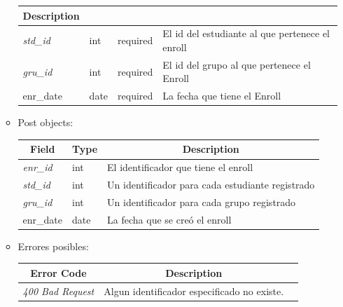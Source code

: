 \documentclass{article}
\begin{document}
\begin{enumerate}
\begin{itemize}
\begin{table}[H]
\begin{tabular}{|l|l|l|l|}
        \multicolumn{1}{c|}{\textbf{Description}} \\ \hline \textit{std\_id} &
        int & required & El id del estudiante al que pertenece el enroll \\
        \hline \textit{gru\_id} & int & required & El id del grupo al que
        pertenece el Enroll \\ \hline enr\_date & date & required & La fecha que
        tiene el Enroll \\ \hline \end{tabular} \end{table}
        \item Post objects:
        \begin{table}[H] \centering \begin{tabular}{|l|l|l|} \hline
        \multicolumn{1}{|c|}{\textbf{Field}} &
        \multicolumn{1}{c|}{\textbf{Type}} &
        \multicolumn{1}{c|}{\textbf{Description}} \\ \hline \textit{enr\_id} &
        int & El identificador que tiene el enroll \\ \hline \textit{std\_id} &
        int & Un identificador para cada estudiante registrado \\ \hline
        \textit{gru\_id} & int & Un identificador para cada grupo registrado \\
        \hline enr\_date & date & La fecha que se creó el enroll \\ \hline
        \end{tabular} \end{table}
        \item Errores posibles: \begin{table}[H] \centering
        \begin{tabular}{|c|c|l|} \hline \textbf{Error Code} &
        \textbf{Description} \\ \hline \textit{400 Bad Request} & Algun
        identificador especificado no existe. \\ \hline \end{tabular}
        \end{table}
        
    \end{itemize}


\end{enumerate}
\end{document}
